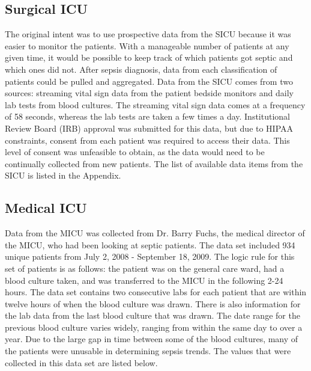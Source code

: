 \documentclass{sig-alternate}
\begin{document}
\vspace{10pt}
\subsection{Surgical ICU}
\label{subsec:sicu}
\vspace{10pt}

The original intent was to use prospective data from the SICU because it was easier to monitor the patients.  With a manageable number of patients at any given time, it would be possible to keep track of which patients got septic and which ones did not.  After sepsis diagnosis, data from each classification of patients could be pulled and aggregated.  Data from the SICU comes from two sources: streaming vital sign data from the patient bedside monitors and daily lab tests from blood cultures.  The streaming vital sign data comes at a frequency of 58 seconds, whereas the lab tests are taken a few times a day.  Institutional Review Board (IRB) approval was submitted for this data, but due to HIPAA constraints, consent from each patient was required to access their data.  This level of consent was unfeasible to obtain, as the data would need to be continually collected from new patients.  The list of available data items from the SICU is listed in the Appendix.

\vspace{10pt}
\subsection{Medical ICU}
\label{subsec:micu}
\vspace{10pt}

Data from the MICU was collected from Dr. Barry Fuchs, the medical director of the MICU, who had been looking at septic patients.  The data set included 934 unique patients from July 2, 2008 - September 18, 2009.  The logic rule for this set of patients is as follows: the patient was on the general care ward, had a blood culture taken, and was transferred to the MICU in the following 2-24 hours.  The data set contains two consecutive labs for each patient that are within twelve hours of when the blood culture was drawn.  There is also information for the lab data from the last blood culture that was drawn.  The date range for the previous blood culture varies widely, ranging from within the same day to over a year.  Due to the large gap in time between some of the blood cultures, many of the patients were unusable in determining sepsis trends.  The values that were collected in this data set are listed below.
\linebreak
\end{document}
